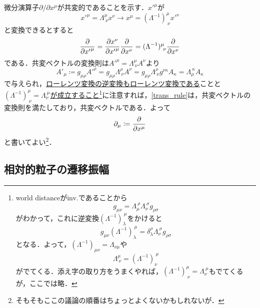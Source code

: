\documentclass[a4paper,pdflatex,ja=standard]{bxjsarticle}
\begin{document}
微分演算子$\partial/\partial x^{\mu}$が共変的であることを示す．${x'}^{\mu}$が
\begin{equation}
  {x'}^{\mu}
  =
  \Lambda^{\mu}_{\ \nu}x^{\nu}
  \longrightarrow
  x^{\mu}
  =
  (\Lambda^{-1})^{\mu}_{\ \nu}{x'}^{\nu}
  \label{trans_rule}
\end{equation}
と変換できるとすると
\begin{equation}
  \pdv{}{{x'}^{\mu}}
  =
  \pdv{x^{\nu}}{{x'}^{\mu}}\pdv{}{x^{\nu}}
  =
  (\Lambda^{-1})^{\mu}_{\ \nu}\pdv{}{x^{\nu}}
\end{equation}
である．共変ベクトルの変換則は${A'}^{\mu}=\Lambda^{\mu}_{\ \nu}A^{\nu}$より
\begin{equation}
  {A'}_{\mu}
  \coloneqq
  g_{\mu\rho}{A'}^{\rho}
  =
  g_{\mu\rho}\Lambda^{\rho}_{\ \nu}A^{\nu}
  =
  g_{\mu\rho}\Lambda^{\rho}_{\ \nu}g^{\nu\kappa}A_{\kappa}
  =
  \Lambda^{\ \kappa}_{\mu}A_{\kappa}
\end{equation}
で与えられ，\uline{ローレンツ変換の逆変換もローレンツ変換である}ことと\uline{$(\Lambda^{-1})^{\mu}_{\ \nu}=\Lambda_{\nu}^{\ \mu}$が成立すること}\footnote{
  world distanceがinv.であることから
  \begin{equation}
    g_{\mu\nu}
    =
    \Lambda_{\mu}^{\ \rho}\Lambda_{\nu}^{\ \sigma}g_{\rho\sigma}
    \nonumber
  \end{equation}
  がわかって，これに逆変換$(\Lambda^{-1})_{\lambda}^{\ \mu}$をかけると
  \begin{equation}
    g_{\mu\nu}(\Lambda^{-1})_{\lambda}^{\ \mu}
    =
    \delta_{\lambda}^{\rho}\Lambda_{\nu}^{\ \sigma}g_{\rho\sigma}
    \nonumber
  \end{equation}
  となる．よって，$(\Lambda^{-1})_{\mu\nu}=\Lambda_{\nu\mu}$や
  \begin{equation}
    \Lambda_{\ \nu}^{\mu}=(\Lambda^{-1})_{\nu}^{\ \mu}
    \nonumber
  \end{equation}
  がでてくる．添え字の取り方をうまくやれば，$(\Lambda^{-1})^{\mu}_{\ \nu}=\Lambda_{\nu}^{\ \mu}$もでてくるが，ここでは略．
}に注意すれば，\eqref{trans_rule}は，共変ベクトルの変換則を満たしており，共変ベクトルである．よって
\begin{equation}
  \partial_{\mu}
  \coloneqq
  \pdv{}{x^{\mu}}
\end{equation}
と書いてよい\footnote{そもそもここの議論の順番はちょっとよくないかもしれないが．}．


\subsection{相対的粒子の遷移振幅}
\end{document}
